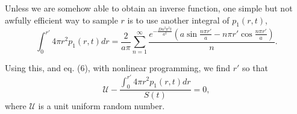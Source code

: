 \documentclass[english]{article}
\begin{document}
Unless we are somehow able to obtain an inverse function, one simple
but not awfully efficient way to sample $r$ is to use another integral
of $p_{1}(r,t)$, \begin{equation}
\int_{0}^{r'}4\pi r^{2}p_{1}(r,t)dr=\frac{2}{a\pi}\sum_{n=1}^{\infty}\frac{e^{-\frac{Dn^{2}\pi^{2}t}{a^{2}}}\left(a\sin\frac{n\pi r'}{a}-n\pi r'\cos\frac{n\pi r'}{a}\right)}{n}.\end{equation}


Using this, and eq. (6), with nonlinear programming, we find $r'$
so that \begin{equation}
\mathcal{U}-\frac{\int_{0}^{r'}4\pi r^{2}p_{1}(r,t)dr}{S(t)}=0,\end{equation}
 where $\mathcal{U}$ is a unit uniform random number.
\end{document}
